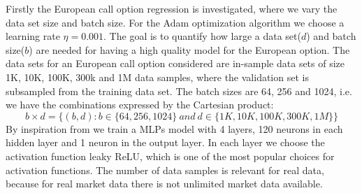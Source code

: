 Firstly the European call option regression is investigated, where we vary the data set size and batch size. For the Adam optimization algorithm we choose a learning rate $\eta=0.001$. The goal is to quantify how large a data set($d$) and batch size($b$) are needed for having a high quality model for the European option. The data sets for an European call option considered are in-sample data sets of size 1K, 10K, 100K, 300k and 1M data samples, where the validation set is subsampled from the training data set. The batch sizes are 64, 256 and 1024, i.e. we have the combinations expressed by the Cartesian product:
$$b \times d = \{(b, d) : b \in \{64, 256, 1024\} \ and \ d \in\{1K,10K,100K,300K,1M \} \}$$
By inspiration from \parencite{HirsaAli2019} we train a MLPs model with 4 layers, 120 neurons in each hidden layer and 1 neuron in the output layer. In each layer we choose the activation function leaky ReLU, which is one of the most popular choices for activation functions. The number of data samples is relevant for real data, because for real market data there is not unlimited market data available.\\

